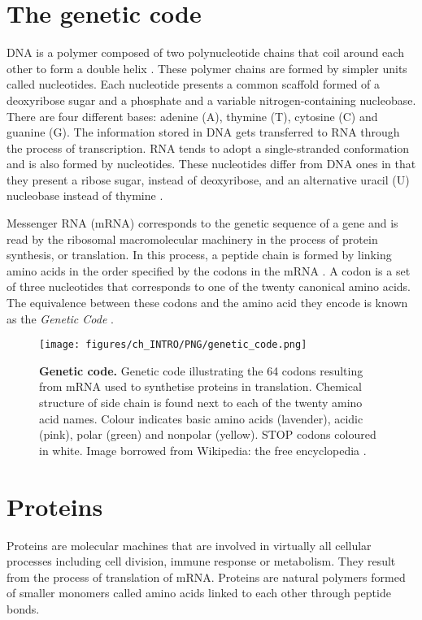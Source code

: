 \section{The genetic code}

DNA is a polymer composed of two polynucleotide chains that coil around each other to form a double helix \cite{WATSON_1953_DNA}. These polymer chains are formed by simpler units called nucleotides. Each nucleotide presents a common scaffold formed of a deoxyribose sugar and a phosphate and a variable nitrogen-containing nucleobase. There are four different bases: adenine (A), thymine (T), cytosine (C) and guanine (G). The information stored in DNA gets transferred to RNA through the process of transcription. RNA tends to adopt a single-stranded conformation and is also formed by nucleotides. These nucleotides differ from DNA ones in that they present a ribose sugar, instead of deoxyribose, and an alternative uracil (U) nucleobase instead of thymine \cite{LEVENE_1909_NUCLEICS}.

Messenger RNA (mRNA) corresponds to the genetic sequence of a gene and is read by the ribosomal macromolecular machinery in the process of protein synthesis, or translation. In this process, a peptide chain is formed by linking amino acids in the order specified by the codons in the mRNA \cite{CRICK_1957_CODE}. A codon is a set of three nucleotides that corresponds to one of the twenty canonical amino acids. The equivalence between these codons and the amino acid they encode is known as the \textit{Genetic Code} \cite{GAMOW_1954_CODE}.

\begin{figure}[htb!]
    \centering
    \texttt{[image: figures/ch\_INTRO/PNG/genetic\_code.png]}
    \caption[Genetic code]{\textbf{Genetic code.} Genetic code illustrating the 64 codons resulting from mRNA used to synthetise proteins in translation. Chemical structure of side chain is found next to each of the twenty amino acid names. Colour indicates basic amino acids (lavender), acidic (pink), polar (green) and nonpolar (yellow). STOP codons coloured in white. Image borrowed from Wikipedia: the free encyclopedia \cite{genetic_code_image}.}
    \label{fig:genetic_code}
\end{figure}

\section{Proteins}

Proteins are molecular machines that are involved in virtually all cellular processes including cell division, immune response or metabolism. They result from the process of translation of mRNA. Proteins are natural polymers formed of smaller monomers called amino acids linked to each other through peptide bonds.

